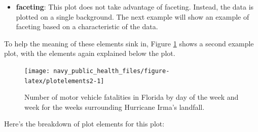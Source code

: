 \documentclass[]{tufte-book}
\begin{document}
\begin{itemize}
{    font, margins, and axis ticks.}
  This plot uses the default \texttt{theme\_gray} theme, with a gray background
  to the main plot area, white gridlines, a Sans Serif font family,
  and a base font size of 11.
  The one customization is that the legend (which here provides the key for
  how color maps to
  day of the week) is shown on the bottom of the plot rather than to the right of
  the plot.
\item
  \textbf{faceting}: This plot does not take advantage of faceting. Instead, the data
  is plotted on a single background. The next example will show an example
  of faceting based on a characteristic of the data.
\end{itemize}

To help the meaning of these elements sink in, Figure \ref{fig:plotelements2}
shows a second example plot, with
the elements again explained below the plot.

\begin{figure}
\texttt{[image: navy\_public\_health\_files/figure-latex/plotelements2-1]} \caption[Number of motor vehicle fatalities in Florida by day of the week and week for the weeks surrounding Hurricane Irma's landfall]{Number of motor vehicle fatalities in Florida by day of the week and week for the weeks surrounding Hurricane Irma's landfall.}\label{fig:plotelements2}
\end{figure}

Here's the breakdown of plot elements for this plot:
\end{document}
